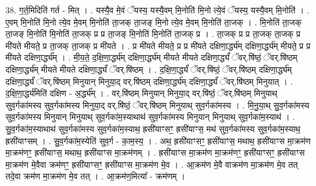 \documentclass[17pt]{extarticle}
\begin{document}
38. ग॒र्त॒मिदिति॑ गर्त - मित् । . यस्यै॒व मे॒वं ॅयस्य॒ यस्यै॒वम् मि॒नोति॑ मि॒नो त्ये॒वं ॅयस्य॒ यस्यै॒वम् मि॒नोति॑ । . ए॒वम् मि॒नोति॑ मि॒नो त्ये॒व मे॒वम् मि॒नोति॑ ता॒जक् ता॒जङ् मि॒नो त्ये॒व मे॒वम् मि॒नोति॑ ता॒जक् । . मि॒नोति॑ ता॒जक् ता॒जङ् मि॒नोति॑ मि॒नोति॑ ता॒जक् प्र प्र ता॒जङ् मि॒नोति॑ मि॒नोति॑ ता॒जक् प्र । . ता॒जक् प्र प्र ता॒जक् ता॒जक् प्र मी॑यते मीयते॒ प्र ता॒जक् ता॒जक् प्र मी॑यते । . प्र मी॑यते मीयते॒ प्र प्र मी॑यते दक्षिणा॒र्द्ध्य॑म् दक्षिणा॒र्द्ध्य॑म् मीयते॒ प्र प्र मी॑यते दक्षिणा॒र्द्ध्य᳚म् । . मी॒य॒ते॒ द॒क्षि॒णा॒र्द्ध्य॑म् दक्षिणा॒र्द्ध्य॑म् मीयते मीयते दक्षिणा॒र्द्ध्यं॑ ॅवर्.षि॑ष्ठं॒ ॅवर्.षि॑ष्ठम् दक्षिणा॒र्द्ध्य॑म् मीयते मीयते दक्षिणा॒र्द्ध्यं॑ ॅवर्.षि॑ष्ठम् । . द॒क्षि॒णा॒र्द्ध्यं॑ ॅवर्.षि॑ष्ठं॒ ॅवर्.षि॑ष्ठम् दक्षिणा॒र्द्ध्य॑म् दक्षिणा॒र्द्ध्यं॑ ॅवर्.षि॑ष्ठम् मिनुयान् मिनुया॒द् वर्.षि॑ष्ठम् दक्षिणा॒र्द्ध्य॑म् दक्षिणा॒र्द्ध्यं॑ ॅवर्.षि॑ष्ठम् मिनुयात् । . द॒क्षि॒णा॒र्द्ध्य॑मिति॑ दक्षिण - अ॒र्द्ध्य᳚म् । . वर्.षि॑ष्ठम् मिनुयान् मिनुया॒द् वर्.षि॑ष्ठं॒ ॅवर्.षि॑ष्ठम् मिनुयाथ् सुव॒र्गका॑मस्य सुव॒र्गका॑मस्य मिनुया॒द् वर्.षि॑ष्ठं॒ ॅवर्.षि॑ष्ठम् मिनुयाथ् सुव॒र्गका॑मस्य । . मि॒नु॒या॒थ् सु॒व॒र्गका॑मस्य सुव॒र्गका॑मस्य मिनुयान् मिनुयाथ् सुव॒र्गका॑म॒स्याथाथ॑ सुव॒र्गका॑मस्य मिनुयान् मिनुयाथ् सुव॒र्गका॑म॒स्याथ॑ । . सु॒व॒र्गका॑म॒स्याथाथ॑ सुव॒र्गका॑मस्य सुव॒र्गका॑म॒स्याथ॒ ह्रसी॑याꣳसꣳ॒॒ ह्रसी॑याꣳस॒ मथ॑ सुव॒र्गका॑मस्य सुव॒र्गका॑म॒स्याथ॒ ह्रसी॑याꣳसम् । . सु॒व॒र्गका॑म॒स्येति॑ सुव॒र्ग - का॒म॒स्य॒ । . अथ॒ ह्रसी॑याꣳसꣳ॒॒ ह्रसी॑याꣳस॒ मथाथ॒ ह्रसी॑याꣳस मा॒क्रम॑ण मा॒क्रम॑णꣳ॒॒ ह्रसी॑याꣳस॒ मथाथ॒ ह्रसी॑याꣳस मा॒क्रम॑णम् । . ह्रसी॑याꣳस मा॒क्रम॑ण मा॒क्रम॑णꣳ॒॒ ह्रसी॑याꣳसꣳ॒॒ ह्रसी॑याꣳस मा॒क्रम॑ण मे॒वैवा क्रम॑णꣳ॒॒ ह्रसी॑याꣳसꣳ॒॒ ह्रसी॑याꣳस मा॒क्रम॑ण मे॒व । . आ॒क्रम॑ण मे॒वै वाक्रम॑ण मा॒क्रम॑ण मे॒व तत् तदे॒वा क्रम॑ण मा॒क्रम॑ण मे॒व तत् । . आ॒क्रम॑ण॒मित्या᳚ - क्रम॑णम् । \newline
\end{document}
